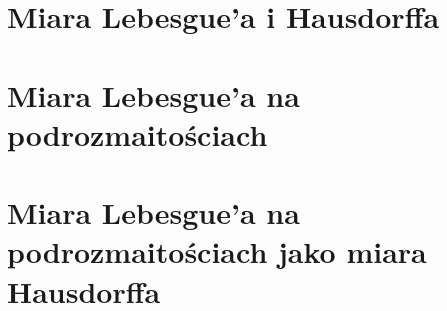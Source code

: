 \chapter{Miara Lebesgue'a i Hausdorffa}


\chapter{Miara Lebesgue'a na \newline podrozmaitościach}


\chapter{Miara Lebesgue'a na \newline podrozmaitościach jako miara \newline Hausdorffa}
